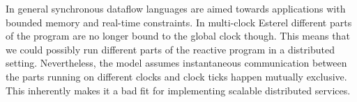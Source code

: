 \cite{lustre}\cite{signal} In general synchronous dataflow languages are aimed towards applications with bounded memory and real-time constraints. In multi-clock Esterel\cite{esterel} different parts of the program are no longer bound to the global clock though. This means that we could possibly run different parts of the reactive program in a distributed setting. Nevertheless, the model assumes instantaneous communication between the parts running on different clocks and clock ticks happen mutually exclusive. This inherently makes it a bad fit for implementing scalable distributed services.


\cite{orleans}

